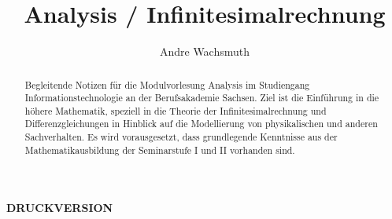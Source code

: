 

\author{Andre Wachsmuth}

\title{Analysis / Infinitesimalrechnung}



\frontmatter

\maketitle

\ifx\TEXPRINT\apar
\else
	\begin{center}
		\textbf{DRUCKVERSION}
	\end{center}
\fi

\begin{abstract}

Begleitende Notizen für die Modulvorlesung Analysis im Studiengang Informationstechnologie an der Berufsakademie Sachsen. Ziel ist die Einführung in die höhere Mathematik, speziell in die Theorie der Infinitesimalrechnung und Differenzgleichungen in Hinblick auf die Modellierung von physikalischen und anderen Sachverhalten. Es wird vorausgesetzt, dass grundlegende Kenntnisse aus der Mathematikausbildung der Seminarstufe I und II vorhanden sind.

\end{abstract}

\clearpage

\tableofcontents*

\clearpage



\mainmatter











\appendix



